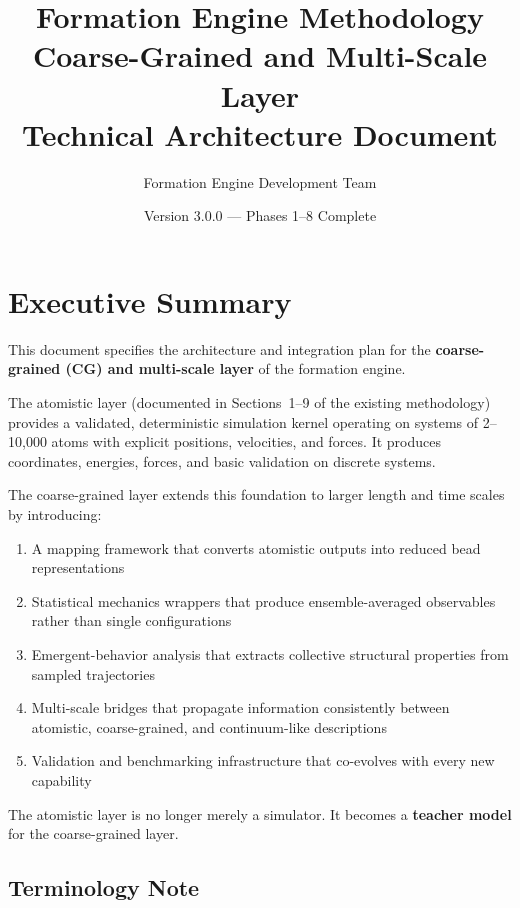 \documentclass[11pt]{article}
\title{\textbf{Formation Engine Methodology} \\
\Large Coarse-Grained and Multi-Scale Layer \\[6pt]
\normalsize Technical Architecture Document}
\author{Formation Engine Development Team}
\date{Version 3.0.0 --- Phases 1--8 Complete}
\begin{document}
\maketitle
\tableofcontents
\newpage

\section{Executive Summary}

This document specifies the architecture and integration plan for the
\textbf{coarse-grained (CG) and multi-scale layer} of the formation engine.

The atomistic layer (documented in Sections~1--9 of the existing methodology)
provides a validated, deterministic simulation kernel operating on systems of
2--10,000 atoms with explicit positions, velocities, and forces.  It produces
coordinates, energies, forces, and basic validation on discrete systems.

The coarse-grained layer extends this foundation to larger length and time
scales by introducing:

\begin{enumerate}
  \item A mapping framework that converts atomistic outputs into reduced
        bead representations
  \item Statistical mechanics wrappers that produce ensemble-averaged
        observables rather than single configurations
  \item Emergent-behavior analysis that extracts collective structural
        properties from sampled trajectories
  \item Multi-scale bridges that propagate information consistently between
        atomistic, coarse-grained, and continuum-like descriptions
  \item Validation and benchmarking infrastructure that co-evolves with
        every new capability
\end{enumerate}

The atomistic layer is no longer merely a simulator.  It becomes a
\textbf{teacher model} for the coarse-grained layer.

\subsection{Terminology Note}
\end{document}
